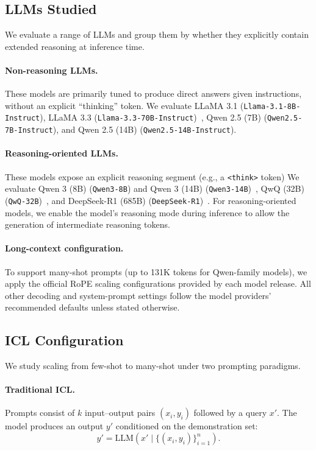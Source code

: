 \subsection{LLMs Studied}
\label{sec:models}
We evaluate a range of LLMs and group them by whether they explicitly contain extended reasoning at inference time.

\paragraph{Non-reasoning LLMs.}
These models are primarily tuned to produce direct answers given instructions, without an explicit ``thinking'' token.
We evaluate LLaMA 3.1 (\texttt{\small Llama-3.1-8B-Instruct}), LLaMA 3.3 (\texttt{\small Llama-3.3-70B-Instruct})~\cite{llama3}, Qwen 2.5 (7B) (\texttt{\small Qwen2.5-7B-Instruct}), and Qwen 2.5 (14B) (\texttt{\small Qwen2.5-14B-Instruct}).

\paragraph{Reasoning-oriented LLMs.}
These models expose an explicit reasoning segment (e.g., a \texttt{<think>} token)
We evaluate Qwen 3 (8B) (\texttt{\small Qwen3-8B}) and Qwen 3 (14B) (\texttt{\small Qwen3-14B})~\cite{yang2025qwen3technicalreport}, QwQ (32B) (\texttt{\small QwQ-32B})~\cite{qwen2025qwen25technicalreport}, and DeepSeek-R1 (685B) (\texttt{\small DeepSeek-R1})~\cite{deepseekai2025deepseekr1incentivizingreasoningcapability}.
For reasoning-oriented models, we enable the model's reasoning mode during inference to allow the generation of intermediate reasoning tokens.

\paragraph{Long-context configuration.}
To support many-shot prompts (up to 131K tokens for Qwen-family models), we apply the official RoPE scaling configurations provided by each model release.
All other decoding and system-prompt settings follow the model providers' recommended defaults unless stated otherwise.

\subsection{ICL Configuration}
\label{sec:icl_config}
We study scaling from few-shot to many-shot under two prompting paradigms.

\paragraph{Traditional ICL.}
Prompts consist of $k$ input--output pairs $(x_i, y_i)$ followed by a query $x'$.
The model produces an output $y'$ conditioned on the demonstration set:
\begin{equation}
y' = \mathrm{LLM}\!\left(x' \mid \{(x_i, y_i)\}_{i=1}^n\right).
\end{equation}

